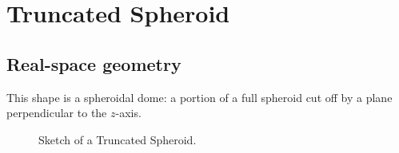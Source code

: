 \FloatBarrier


\newpage{\cleardoublepage}

\section{Truncated Spheroid} 

\subsection{Real-space geometry}
This shape is a spheroidal dome: a portion of a full spheroid cut off
by a plane perpendicular to the $z$-axis.

\begin{figure}[ht]
\hfill
{}
\hfill
{}
\hfill
\caption{Sketch of a Truncated Spheroid.}
\label{fig:spheroid}
\end{figure}

